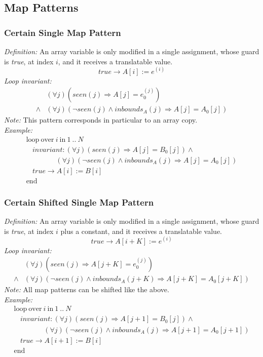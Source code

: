 \documentclass[a4paper,10pt]{article}
\newcommand{\idx}{\ensuremath{i}\xspace}
\newcommand{\at}[1]{{(#1)}}
\newcommand{\KWloop}{\ensuremath{\mathrm{loop}~}}
\newcommand{\KWend}{\ensuremath{\mathrm{end}~}}
\newcommand{\KWover}{\ensuremath{\mathrm{over}~}}
\newcommand{\KWin}{\ensuremath{~\mathrm{in}~}}
\newcommand{\impl}{\ensuremath{\Longrightarrow}}
\newcommand{\inbounds}[2]{\ensuremath{\mathit{inbounds}_{#1}(#2)}\xspace}
\newcommand{\seen}[1]{\ensuremath{\mathit{seen}(#1)}\xspace}
\newcommand{\loopinvariant}{\noindent\textit{Loop invariant:}\xspace}
\newcommand{\patterndef}{\noindent\textit{Definition:}\xspace}
\newcommand{\patternexample}{\noindent\textit{Example:}\xspace}
\newcommand{\patternnote}{\noindent\textit{Note:}\xspace}
\begin{document}
\subsection{Map Patterns}

\subsubsection*{Certain Single Map Pattern}

\patterndef An array variable is only modified in a single assignment, whose
guard is \textit{true}, at index \idx, and it receives a translatable value.
%
$$\mathit{true} \rightarrow A[\idx] := e^\at{\idx}$$
%
\loopinvariant
%
\begin{eqnarray*}
&(\forall j)(\seen{j} \impl A[j] = e_0^\at{j}) \\
\land& (\forall j)(\neg \seen{j} \land \inbounds{A}{j} \impl A[j] = A_0[j])
\end{eqnarray*}
%
\patternnote This pattern corresponds in particular to an array copy.\\
%
\patternexample
$$\begin{array}{l}
  \KWloop \KWover i \KWin 1~..~N \\
  ~~~~ \textit{invariant}: (\forall j)(\seen{j} \impl A[j] = B_0[j]) \land\\
  ~~~~~~~~~~~~~~~~~~~ (\forall j)(\neg \seen{j} \land \inbounds{A}{j} \impl A[j] = A_0[j])\\
  ~~~~ true \rightarrow A[i] := B[i]\\
  \KWend
\end{array}$$

\subsubsection*{Certain Shifted Single Map Pattern}

\patterndef An array variable is only modified in a single assignment, whose
guard is \textit{true}, at index \idx plus a constant, and it receives a
translatable value.
%
$$\mathit{true} \rightarrow A[\idx + K] := e^\at{\idx}$$
%
\loopinvariant
%
\begin{eqnarray*}
&(\forall j)(\seen{j} \impl A[j + K] = e_0^\at{j}) \\
\land& (\forall j)(\neg \seen{j} \land \inbounds{A}{j + K} \impl A[j + K] = A_0[j + K])
\end{eqnarray*}
%
\patternnote All map patterns can be shifted like the above.\\
%
\patternexample
$$\begin{array}{l}
  \KWloop \KWover i \KWin 1~..~N \\
  ~~~~ \textit{invariant}: (\forall j)(\seen{j} \impl A[j+1] = B_0[j]) \land\\
  ~~~~~~~~~~~~~~~~~~~ (\forall j)(\neg \seen{j} \land \inbounds{A}{j} \impl A[j+1] = A_0[j+1])\\
  ~~~~ true \rightarrow A[i+1] := B[i]\\
  \KWend
\end{array}$$
\end{document}
